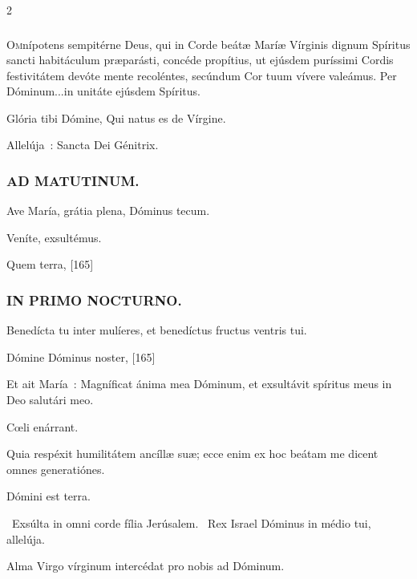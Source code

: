 \documentclass[9pt,twoside]{extarticle}
\begin{document}
\begin{multicols}{2}
\subsubsection*{\center {}}
\lettrine{O}mnípotens sempitérne Deus, qui in Corde beátæ Maríæ Vírginis dignum Spíritus sancti habitáculum præparásti, concéde propítius, ut ejúsdem puríssimi Cordis festivitátem devóte mente recoléntes, secúndum Cor tuum vívere valeámus. Per Dóminum...in unitáte ejúsdem Spíritus.

\begin{tightlist}{}
\item {}
\item {} Glória tibi Dómine, Qui natus es de Vírgine.
\item {} Allelúja~: Sancta Dei Génitrix.
\end{tightlist}

\subsubsection*{\center \textsc{AD MATUTINUM.}}
\begin{tightlist}{}
\item {} Ave María, grátia plena, \textred{*} Dóminus tecum.
\item {} Veníte, exsultémus.
\item {} Quem terra,  [165]
\end{tightlist}

\subsubsection*{\center \textsc{IN PRIMO NOCTURNO.}}
\begin{tightlist}{}
\item {} Benedícta tu inter mulíeres, et benedíctus fructus ventris tui.
\item {} Dómine Dóminus noster,  [165]
\item {} Et ait María~: Magníficat ánima mea Dóminum, et exsultávit spíritus meus in Deo salutári meo.
\item {} Cœli enárrant.
\item {} Quia respéxit humilitátem ancíllæ suæ; ecce enim ex hoc beátam me dicent omnes generatiónes.
\item {} Dómini est terra.
\item {}~Exsúlta in omni corde fília Jerúsalem. ~Rex Israel Dóminus in médio tui, allelúja.
\item {} Alma Virgo vírginum intercédat pro nobis ad Dóminum.
\end{tightlist}


\end{multicols}
\end{document}
